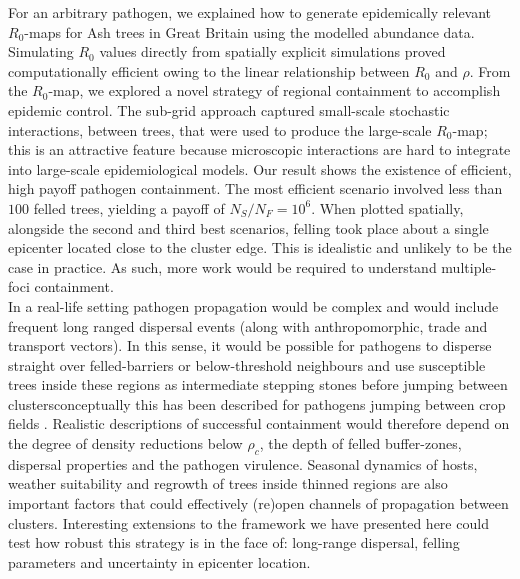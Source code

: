 For an arbitrary pathogen, we explained how to generate epidemically relevant $R_0$-maps for Ash trees in Great Britain using the modelled abundance data. Simulating $R_0$ values directly from spatially explicit simulations proved computationally efficient owing to the linear relationship between $R_0$ and $\rho$. From the $R_0$-map, we explored a novel strategy of regional containment to accomplish epidemic control. The sub-grid approach captured small-scale stochastic interactions, between trees, that were used to produce the large-scale $R_0$-map; this is an attractive feature because microscopic interactions are hard to integrate into large-scale epidemiological models. Our result shows the existence of efficient, high payoff pathogen containment. The most efficient scenario involved less than $100$ felled trees, yielding a payoff of $N_S/N_F = 10^6$. When plotted spatially, alongside the second and third best scenarios, felling took place about a single epicenter located close to the cluster edge. This is idealistic and unlikely to be the case in practice. As such, more work would be required to understand multiple-foci containment.\\

In a real-life setting pathogen propagation would be complex and would include frequent long ranged dispersal events (along with anthropomorphic, trade and transport vectors). In this sense, it would be possible for pathogens to disperse straight over felled-barriers or below-threshold neighbours and use susceptible trees inside these regions as intermediate stepping stones before jumping between clusters\textemdash conceptually this has been described for pathogens jumping between crop fields \cite{Gilligan-disease-management}. Realistic descriptions of successful containment would therefore depend on the degree of density reductions below $\rho_c$, the depth of felled buffer-zones, dispersal properties and the pathogen virulence. Seasonal dynamics of hosts, weather suitability and regrowth of trees inside thinned regions are also important factors that could effectively (re)open channels of propagation between clusters. Interesting extensions to the framework we have presented here could test how robust this strategy is in the face of: long-range dispersal, felling parameters and uncertainty in epicenter location.\\ 

